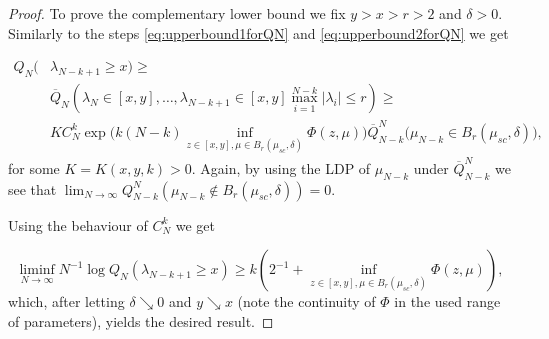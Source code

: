 \begin{proof}
	To prove the complementary lower bound we fix $y>x>r>2$ and $\delta>0$. Similarly to the steps \ref{eq:upperbound1forQN} and \ref{eq:upperbound2forQN} we get
	
	\begin{align*}
		Q_N(&\lambda_{N-k+1}\geq x)\geq \\
		&\overline Q_N(\lambda_N\in[x,y],\dots,\lambda_{N-k+1}\in[x,y]\max_{i=1}^{N-k}|\lambda_i|\leq r)\geq\\
		&KC_N^k\exp\Big(k(N-k)\inf_{z\in[x,y],\mu\in B_r(\mu_{sc},\delta)}\Phi(z,\mu)\Big)\overline Q_{N-k}^N\big(\mu_{N-k}\in B_r(\mu_{sc},\delta)\big),
	\end{align*}
	for some $K=K(x,y,k)>0$. Again, by using the LDP of $\mu_{N-k}$ under $\overline Q_{N-k}^N$ we see that $\lim_{N\rightarrow\infty}Q_{N-k}^N(\mu_{N-k}\notin B_r(\mu_{sc},\delta))=0$.
	
	Using the behaviour of $C_N^k$ we get
	
	\begin{equation*}
		\liminf_{N\rightarrow\infty}N^{-1}\log Q_N(\lambda_{N-k+1}\geq x)\geq k(2^{-1} + \inf_{z\in[x,y],\mu\in B_r(\mu_{sc},\delta)}\Phi(z,\mu)),
	\end{equation*}
	which, after letting $\delta\searrow 0$ and $y\searrow x$ (note the continuity of $\Phi$ in the used range of parameters), yields the desired result.
\end{proof}

